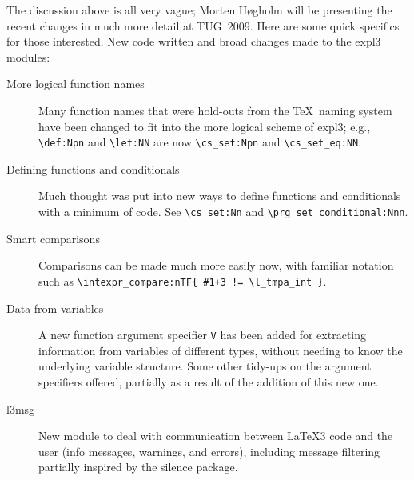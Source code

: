 \documentclass{ltnews}
\begin{document}
The discussion above is all very vague; Morten H\o gholm will be presenting
the recent changes in much more detail at TUG~2009. Here are some quick specifics for
those interested. New code written and broad changes made to the
\textsf{expl3} modules:
\begin{description}
\item [More logical function names]
  Many function names that were hold-outs from the \TeX\ naming system
  have been changed to fit into the more logical scheme of \textsf{expl3}; e.g.,
  \verb|\def:Npn| and \verb|\let:NN| are now \verb|\cs_set:Npn| and 
  \verb|\cs_set_eq:NN|.
  
\item [Defining functions and conditionals] 
  Much thought was put into new ways to define
  functions and conditionals with a minimum of code.
  See \verb|\cs_set:Nn| and \verb|\prg_set_conditional:Nnn|.
  
\item [Smart comparisons] 
  Comparisons can be made much more easily
  now, with familiar notation such as 
  \verb|\intexpr_compare:nTF{ #1+3 != \l_tmpa_int }|.
  
\item [Data from variables] 
  A new function argument specifier \texttt{V} 
  has been added for extracting information from variables of different types, 
  without needing to know the underlying variable structure. Some other
  tidy-ups on the argument specifiers offered, partially as a result of the addition of this new one.
  
\item [l3msg] 
  New module to deal with communication between \LaTeX3 
  code and the user (info messages, warnings, and errors), including
  message filtering partially inspired by the \textsf{silence} package.
\end{description}
\end{document}
